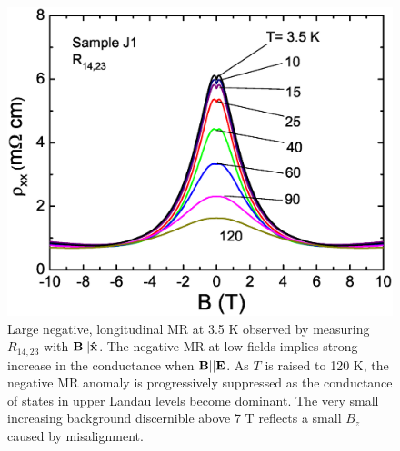 \begin{figure}[!htbp]
  \begin{center}
\includegraphics[width=0.9\linewidth]{ch-na3bi/figures/FigJ1MRvsT.eps}
\caption{\label{J1MRT} 
Large negative, longitudinal MR at 3.5 K observed by measuring $R_{14,23}$ with $\bf{B}||\bf\hat{x}$. The negative MR at low fields implies strong increase in the conductance when $\bf{B}||\bf{E}$. As $T$ is raised to 120 K, the negative MR anomaly is progressively suppressed as the conductance of states in upper Landau levels become dominant. The very small increasing background discernible above 7 T reflects a small $B_z$ caused by misalignment.}
  \end{center}
\end{figure}







